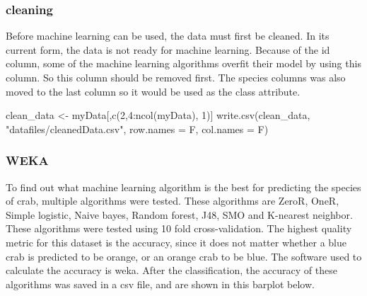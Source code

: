 \documentclass[
]{article}
\newenvironment{Shaded}{}{}
\newcommand{\AttributeTok}[1]{#1}
\newcommand{\DecValTok}[1]{#1}
\newcommand{\FunctionTok}[1]{#1}
\newcommand{\NormalTok}[1]{#1}
\newcommand{\OtherTok}[1]{\textcolor[rgb]{1.00,0.25,0.00}{#1}}
\newcommand{\SpecialCharTok}[1]{\textcolor[rgb]{0.00,0.50,0.50}{#1}}
\newcommand{\StringTok}[1]{\textcolor[rgb]{0.00,0.50,0.50}{#1}}
\begin{document}
\hypertarget{cleaning}{%
\subsubsection{cleaning}\label{cleaning}}

Before machine learning can be used, the data must first be cleaned. In
its current form, the data is not ready for machine learning. Because of
the id column, some of the machine learning algorithms overfit their
model by using this column. So this column should be removed first. The
species columns was also moved to the last column so it would be used as
the class attribute.

\begin{Shaded}
\begin{Highlighting}[]
\NormalTok{clean\_data }\OtherTok{\textless{}{-}}\NormalTok{ myData[,}\FunctionTok{c}\NormalTok{(}\DecValTok{2}\NormalTok{,}\DecValTok{4}\SpecialCharTok{:}\FunctionTok{ncol}\NormalTok{(myData), }\DecValTok{1}\NormalTok{)]}
\FunctionTok{write.csv}\NormalTok{(clean\_data, }\StringTok{"datafiles/cleanedData.csv"}\NormalTok{, }\AttributeTok{row.names =}\NormalTok{ F, }\AttributeTok{col.names =}\NormalTok{ F)}
\end{Highlighting}
\end{Shaded}

\hypertarget{weka}{%
\subsubsection{WEKA}\label{weka}}

To find out what machine learning algorithm is the best for predicting
the species of crab, multiple algorithms were tested. These algorithms
are ZeroR, OneR, Simple logistic, Naive bayes, Random forest, J48, SMO
and K-nearest neighbor. These algorithms were tested using 10 fold
cross-validation. The highest quality metric for this dataset is the
accuracy, since it does not matter whether a blue crab is predicted to
be orange, or an orange crab to be blue. The software used to calculate
the accuracy is weka. After the classification, the accuracy of these
algorithms was saved in a csv file, and are shown in this barplot below.
\end{document}
